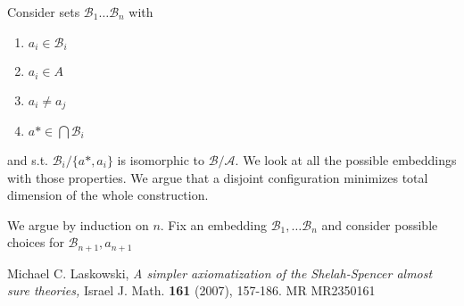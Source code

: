 \documentclass{amsart}
\newcommand{\A}{\mathcal A}
\newcommand{\B}{\mathcal B}
\begin{document}
Consider sets $\B_1 \ldots \B_n$ with 
\begin{enumerate}
	\item $a_i \in \B_i$
	\item $a_i \in A$
	\item $a_i \neq a_j$
	\item $a* \in \bigcap \B_i$
\end{enumerate}
 and  s.t. $\B_i / \{a*, a_i\}$ is isomorphic to $\B/\A$. We look at all the possible embeddings with those properties. We argue that a disjoint configuration minimizes total dimension of the whole construction.

We argue by induction on $n$. Fix an embedding $\B_1, \ldots \B_n$ and consider possible choices for $\B_{n+1}, a_{n+1}$

\begin{thebibliography}{9}

	Michael C. Laskowski, \textsl{A simpler axiomatization of the Shelah-Spencer almost sure theories,}
	Israel J. Math. \textbf{161} (2007), 157-186. MR MR2350161

\end{thebibliography}
\end{document}

